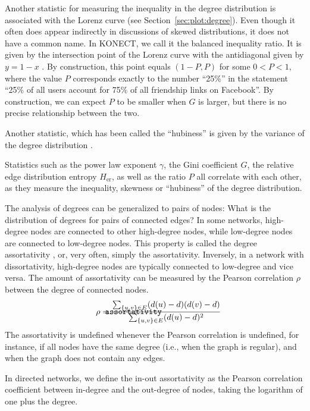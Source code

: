 \documentclass{article}
\def\mathnote#1{%
  \tag*{\rlap{\hspace\marginparsep\smash{\parbox[t]{\marginparwidth}{#1}}}}
}
\begin{document}
Another statistic for  measuring the inequality
in the degree distribution is associated with the Lorenz curve (see
Section~\ref{sec:plot:degree}).  Even though it often does appear
indirectly in discussions of skewed distributions, it does not have a
common name.  In KONECT, we call it the balanced inequality ratio. 
It is given by the intersection point
of the Lorenz curve with the antidiagonal given by $y = 1 - x$
\citep{kunegis:power-law}.  By construction, this point equals $(1-P, P)$
for some $0<P<1$, where the value $P$ corresponds exactly to the number
``25\%'' in the statement ``25\% of all users account for 75\% of all
friendship links on Facebook''.  By construction, we can expect $P$ to
be smaller when $G$ is larger, but there is no precise relationship
between the two.

Another statistic, which has been called the ``hubiness'' is given by
the variance of the degree distribution \cite[e.g. by][]{b883,b884}.

Statistics such as the power law exponent $\gamma$, the Gini coefficient
$G$, the relative edge distribution entropy $H_{\mathrm{er}}$, as well
as the ratio $P$ all correlate with each other, as they measure the
inequality, skewness or ``hubiness'' of the degree distribution. 

The analysis of degrees can be generalized to pairs of nodes:  What is
the distribution of degrees for pairs of connected edges?  In some
networks, high-degree nodes are connected to other high-degree nodes,
while low-degree nodes are connected to low-degree nodes.  This property
is called the degree assortativity \citep{b854}, or, very often, simply the
assortativity.  Inversely, in a network with dissortativity,  
high-degree nodes are typically connected to low-degree and vice versa.
The amount of assortativity can be measured by the Pearson correlation
$\rho$ between the degree of connected nodes.  
\begin{align}
  \mathnote{\texttt{assortativity}} 
  \rho &= \frac
  {\sum_{\{u,v\} \in E} (d(u) - d)(d(v) - d)}
  {\sum_{\{u,v\} \in E} (d(u) - d)^2}
\end{align}
The assortativity is
undefined whenever the Pearson correlation is undefined, for instance,
if all nodes have the same degree (i.e., when the graph is regular), and
when the graph does not contain any edges. 

In directed networks, we define the in-out assortativity as the Pearson
correlation coefficient between in-degree and the out-degree of nodes,
taking the logarithm of one plus the degree.
\end{document}
